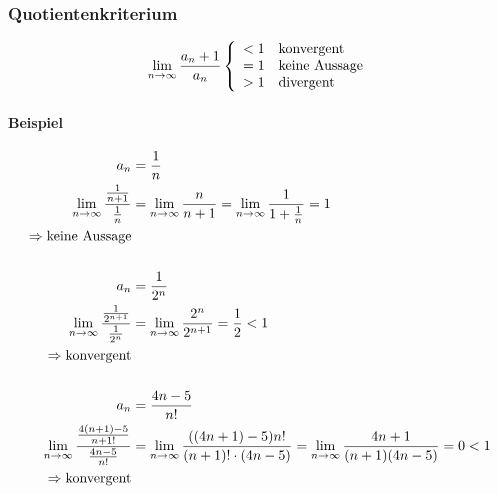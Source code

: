\subsubsection{Quotientenkriterium}

\[
    \lim_{n \rightarrow{} \infty} \frac{a_n + 1}{a_n}
    \left \{
    \begin{array}{l}
        < 1 \quad \text{konvergent} \\
        = 1 \quad \text{keine Aussage} \\
        > 1 \quad \text{divergent}
    \end{array}
    \right.
\]

\paragraph{Beispiel}

\begin{align*}
    a_n &= \frac{1}{n} \\
    \lim_{n \rightarrow{} \infty} \frac{\frac{1}{n + 1}}{\frac{1}{n}} &= \lim_{n \rightarrow{} \infty} \frac{n}{n+1} = \lim_{n \rightarrow{} \infty} \frac{1}{1 + \frac{1}{n}} = 1 \\
    \Rightarrow \text{keine Aussage} \\
    \\
    a_n &= \frac{1}{2^n} \\
    \lim_{n \rightarrow{} \infty} \frac{\frac{1}{2^{n+1}}}{\frac{1}{2^n}} &= \lim_{n \rightarrow{} \infty} \frac{2^n}{2^{n+1}} = \frac{1}{2} < 1 \\
    \Rightarrow \text{konvergent} \\
    \\
    a_n &= \frac{4n-5}{n!} \\
    \lim_{n \rightarrow{} \infty} \frac{\frac{4(n+1) -5}{n+1!}}{\frac{4n-5}{n!}} &= \lim_{n \rightarrow{} \infty} \frac{((4n+1) -5) n!}{(n+1)!\cdot (4n-5)} = \lim_{n \rightarrow{} \infty} \frac{4n+1}{(n+1)(4n-5)} = 0 < 1 \\
    \Rightarrow \text{konvergent}
\end{align*}
